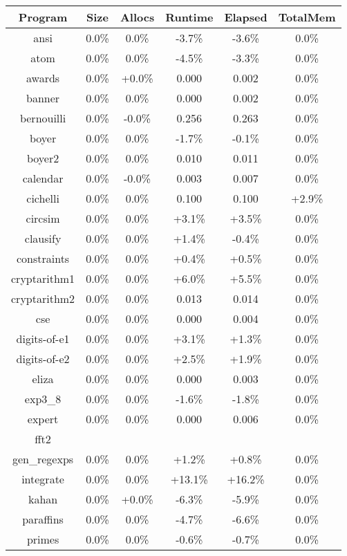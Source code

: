 \begin{tabular}{ c c c c c c }
Program & Size & Allocs & Runtime & Elapsed & TotalMem\\
\hline
ansi &  0.0\% &  0.0\% & -3.7\% & -3.6\% &  0.0\%\\
atom &  0.0\% &  0.0\% & -4.5\% & -3.3\% &  0.0\%\\
awards &  0.0\% & +0.0\% & 0.000 & 0.002 &  0.0\%\\
banner &  0.0\% &  0.0\% & 0.000 & 0.002 &  0.0\%\\
bernouilli &  0.0\% & -0.0\% & 0.256 & 0.263 &  0.0\%\\
boyer &  0.0\% &  0.0\% & -1.7\% & -0.1\% &  0.0\%\\
boyer2 &  0.0\% &  0.0\% & 0.010 & 0.011 &  0.0\%\\
calendar &  0.0\% & -0.0\% & 0.003 & 0.007 &  0.0\%\\
cichelli &  0.0\% &  0.0\% & 0.100 & 0.100 & +2.9\%\\
circsim &  0.0\% &  0.0\% & +3.1\% & +3.5\% &  0.0\%\\
clausify &  0.0\% &  0.0\% & +1.4\% & -0.4\% &  0.0\%\\
constraints &  0.0\% &  0.0\% & +0.4\% & +0.5\% &  0.0\%\\
cryptarithm1 &  0.0\% &  0.0\% & +6.0\% & +5.5\% &  0.0\%\\
cryptarithm2 &  0.0\% &  0.0\% & 0.013 & 0.014 &  0.0\%\\
cse &  0.0\% &  0.0\% & 0.000 & 0.004 &  0.0\%\\
digits-of-e1 &  0.0\% &  0.0\% & +3.1\% & +1.3\% &  0.0\%\\
digits-of-e2 &  0.0\% &  0.0\% & +2.5\% & +1.9\% &  0.0\%\\
eliza &  0.0\% &  0.0\% & 0.000 & 0.003 &  0.0\%\\
exp3\_8 &  0.0\% &  0.0\% & -1.6\% & -1.8\% &  0.0\%\\
expert &  0.0\% &  0.0\% & 0.000 & 0.006 &  0.0\%\\
fft2 &  &  &  &  & \\
gen\_regexps &  0.0\% &  0.0\% & +1.2\% & +0.8\% &  0.0\%\\
integrate &  0.0\% &  0.0\% & +13.1\% & +16.2\% &  0.0\%\\
kahan &  0.0\% & +0.0\% & -6.3\% & -5.9\% &  0.0\%\\
paraffins &  0.0\% &  0.0\% & -4.7\% & -6.6\% &  0.0\%\\
primes &  0.0\% &  0.0\% & -0.6\% & -0.7\% &  0.0\%\\

\end{tabular}
